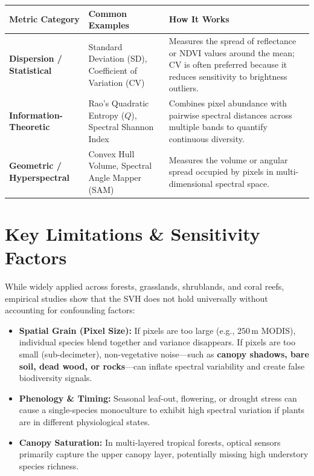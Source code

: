 \documentclass[11pt,letterpaper]{article}
\begin{document}
\begin{table}[h!]
\centering
\renewcommand{\arraystretch}{1.35}
\begin{tabularx}{\textwidth}{>{\raggedright\arraybackslash}p{} >{\raggedright\arraybackslash}p{} >{\raggedright\arraybackslash}X}
\toprule
\textbf{Metric Category} & \textbf{Common Examples} & \textbf{How It Works} \\
\midrule
\textbf{Dispersion / Statistical} & Standard Deviation (SD), Coefficient of Variation (CV) & Measures the spread of reflectance or NDVI values around the mean; CV is often preferred because it reduces sensitivity to brightness outliers. \\
\textbf{Information-Theoretic} & Rao's Quadratic Entropy ($Q$), Spectral Shannon Index & Combines pixel abundance with pairwise spectral distances across multiple bands to quantify continuous diversity. \\
\textbf{Geometric / Hyperspectral} & Convex Hull Volume, Spectral Angle Mapper (SAM) & Measures the volume or angular spread occupied by pixels in multi-dimensional spectral space. \\
\bottomrule
\end{tabularx}
\end{table}

\section{Key Limitations \& Sensitivity Factors}

While widely applied across forests, grasslands, shrublands, and coral reefs, empirical studies show that the SVH does not hold universally without accounting for confounding factors:

\begin{itemize}[leftmargin=1.5em]
    \item \textbf{Spatial Grain (Pixel Size):} If pixels are too large (e.g., $250\,\text{m}$ MODIS), individual species blend together and variance disappears. If pixels are too small (sub-decimeter), non-vegetative noise---such as \textbf{canopy shadows, bare soil, dead wood, or rocks}---can inflate spectral variability and create false biodiversity signals.
    \item \textbf{Phenology \& Timing:} Seasonal leaf-out, flowering, or drought stress can cause a single-species monoculture to exhibit high spectral variation if plants are in different physiological states.
    \item \textbf{Canopy Saturation:} In multi-layered tropical forests, optical sensors primarily capture the upper canopy layer, potentially missing high understory species richness.
\end{itemize}
\end{document}
